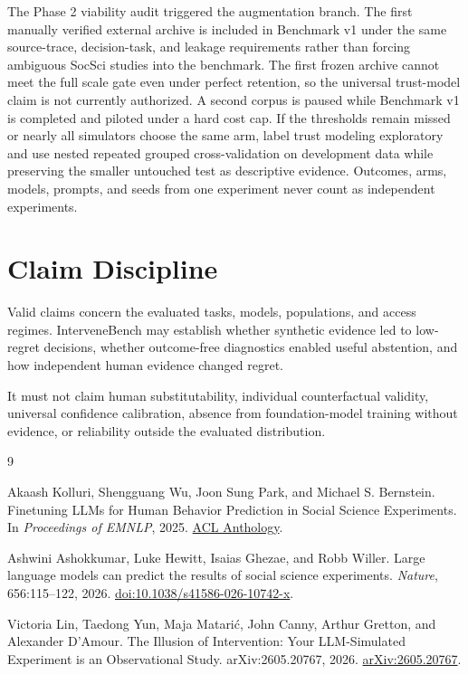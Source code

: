 \documentclass[11pt]{article}
\begin{document}
The Phase 2 viability audit triggered the augmentation branch. The first manually verified external archive is included in Benchmark v1 under the same source-trace, decision-task, and leakage requirements rather than forcing ambiguous SocSci studies into the benchmark. The first frozen archive cannot meet the full scale gate even under perfect retention, so the universal trust-model claim is not currently authorized. A second corpus is paused while Benchmark v1 is completed and piloted under a hard cost cap. If the thresholds remain missed or nearly all simulators choose the same arm, label trust modeling exploratory and use nested repeated grouped cross-validation on development data while preserving the smaller untouched test as descriptive evidence. Outcomes, arms, models, prompts, and seeds from one experiment never count as independent experiments.

\section{Claim Discipline}

Valid claims concern the evaluated tasks, models, populations, and access regimes. InterveneBench may establish whether synthetic evidence led to low-regret decisions, whether outcome-free diagnostics enabled useful abstention, and how independent human evidence changed regret.

It must not claim human substitutability, individual counterfactual validity, universal confidence calibration, absence from foundation-model training without evidence, or reliability outside the evaluated distribution.

\begingroup
\footnotesize
\begin{thebibliography}{9}

Akaash Kolluri, Shengguang Wu, Joon Sung Park, and Michael S. Bernstein.
\newblock Finetuning LLMs for Human Behavior Prediction in Social Science Experiments.
\newblock In \emph{Proceedings of EMNLP}, 2025.
\newblock \href{https://aclanthology.org/2025.emnlp-main.1530/}{ACL Anthology}.

Ashwini Ashokkumar, Luke Hewitt, Isaias Ghezae, and Robb Willer.
\newblock Large language models can predict the results of social science experiments.
\newblock \emph{Nature}, 656:115--122, 2026.
\newblock \href{https://doi.org/10.1038/s41586-026-10742-x}{doi:10.1038/s41586-026-10742-x}.

Victoria Lin, Taedong Yun, Maja Matari\'c, John Canny, Arthur Gretton, and Alexander D'Amour.
\newblock The Illusion of Intervention: Your LLM-Simulated Experiment is an Observational Study.
\newblock arXiv:2605.20767, 2026.
\newblock \href{https://arxiv.org/abs/2605.20767}{arXiv:2605.20767}.

\end{thebibliography}
\endgroup
\end{document}
